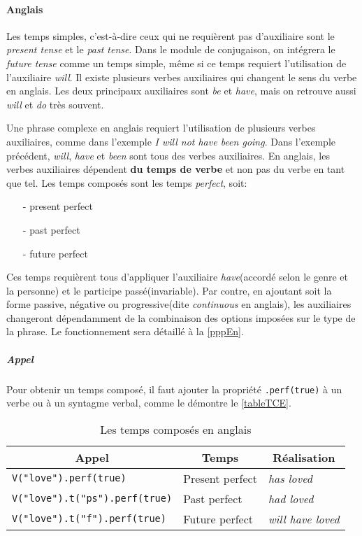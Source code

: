 \documentclass[11pt]{article} %
\newcommand{\real}[1]{\emph{#1}}
\begin{document}
\paragraph{Anglais}

Les temps simples, c'est-à-dire ceux qui ne requièrent pas d'auxiliaire
sont le \emph{present tense} et le \emph{past tense}. Dans le module de
conjugaison, on intégrera le \emph{future tense} comme un temps simple, même si 
ce temps requiert l'utilisation de l'auxiliaire \emph{will}.
Il existe plusieurs verbes auxiliaires qui changent
le sens du verbe en anglais. Les deux principaux auxiliaires sont \emph{be}
et \emph{have}, mais on retrouve aussi \emph{will} et \emph{do} très souvent.

Une phrase complexe en anglais requiert l'utilisation de plusieurs verbes auxiliaires,
comme dans l'exemple \real{I will not have been going}. Dans l'exemple
précédent, \emph{will}, \emph{have} et \emph{been} sont tous des verbes
auxiliaires. En anglais,
les verbes auxiliaires dépendent \textbf{du temps de verbe} et non pas du 
verbe en tant que tel. Les temps composés sont les
temps \emph{perfect}, soit:
\begin{itemize}
\item[-]present perfect
\item[-]past perfect
\item[-]future perfect
\end{itemize} Ces temps requièrent tous d'appliquer l'auxiliaire
\emph{have}(accordé selon le genre et la personne) et le participe passé(invariable). Par contre, en ajoutant soit la forme passive, négative ou progressive(dite \emph{continuous}
en anglais), les auxiliaires changeront dépendamment de la combinaison
des options imposées sur le type de la phrase. Le fonctionnement sera détaillé à la \autoref{pppEn}.

\subparagraph{Appel}

Pour obtenir un temps composé, il faut ajouter la propriété \texttt{.perf(true)} à un verbe ou à un syntagme verbal, comme le démontre le \autoref{tableTCE}.

\begin{table}[ht]
\caption{Les temps composés en anglais}
\centering
\begin{tabular}{|l|l|l|}
\hline
\multicolumn{1}{|c}{Appel} & \multicolumn{1}{|c}{Temps} & \multicolumn{1}{|c|}{Réalisation} \\
\hline
\hline
\texttt{V("love").perf(true)} & Present perfect & \real{has loved} \\
\hline
\texttt{V("love").t("ps").perf(true)} & Past perfect & \real{had loved} \\
\hline
\texttt{V("love").t("f").perf(true)} & Future perfect & \real{will have loved} \\
\hline
\end{tabular}
\label{tableTCE}
\end{table}
\end{document}

